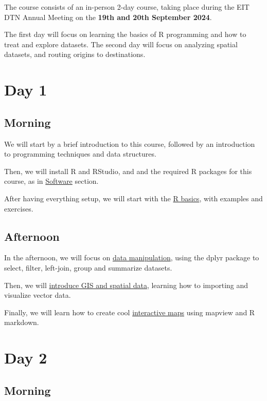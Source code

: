 \documentclass[
  letterpaper,
  DIV=11,
  numbers=noendperiod]{scrreprt}
\begin{document}
The course consists of an in-person 2-day course, taking place during
the EIT DTN Annual Meeting on the \textbf{19th and 20th September 2024}.

The first day will focus on learning the basics of R programming and how
to treat and explore datasets. The second day will focus on analyzing
spatial datasets, and routing origins to destinations.

\section{Day 1}\label{day-1}

\subsection*{Morning}\label{morning}

We will start by a brief introduction to this course, followed by an
introduction to programming techniques and data structures.

Then, we will install R and RStudio, and and the required R packages for
this course, as in \href{software.qmd}{Software} section.

After having everything setup, we will start with the
\href{r-basics.qmd}{R basics}, with examples and exercises.

\subsection*{Afternoon}\label{afternoon}

In the afternoon, we will focus on \href{data-manipulation.qmd}{data
manipulation}, using the dplyr package to select, filter, left-join,
group and summarize datasets.

Then, we will \href{spatial-data.qmd}{introduce GIS and spatial data},
learning how to importing and visualize vector data.

Finally, we will learn how to create cool
\href{interactive-maps.qmd}{interactive maps} using mapview and R
markdown.

\section{Day 2}\label{day-2}

\subsection*{Morning}\label{morning-1}
\end{document}
